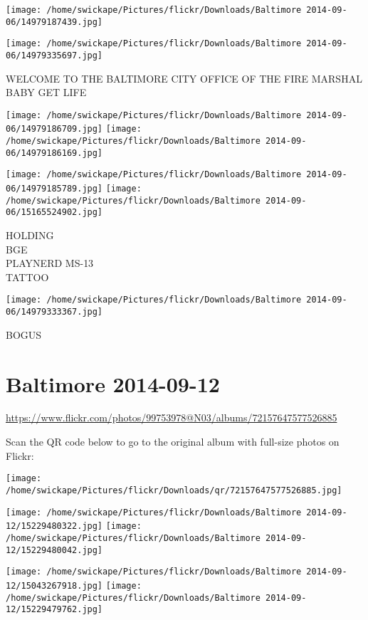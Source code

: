 \documentclass[10pt,letterpaper]{article}
\begin{document}
\texttt{[image: /home/swickape/Pictures/flickr/Downloads/Baltimore 2014-09-06/14979187439.jpg]}

\vspace{0.25in}
\texttt{[image: /home/swickape/Pictures/flickr/Downloads/Baltimore 2014-09-06/14979335697.jpg]}

WELCOME TO THE BALTIMORE CITY OFFICE OF THE FIRE MARSHAL\\
BABY GET LIFE
\pagebreak

\texttt{[image: /home/swickape/Pictures/flickr/Downloads/Baltimore 2014-09-06/14979186709.jpg]}
\texttt{[image: /home/swickape/Pictures/flickr/Downloads/Baltimore 2014-09-06/14979186169.jpg]}

\texttt{[image: /home/swickape/Pictures/flickr/Downloads/Baltimore 2014-09-06/14979185789.jpg]}
\texttt{[image: /home/swickape/Pictures/flickr/Downloads/Baltimore 2014-09-06/15165524902.jpg]}

HOLDING\\
BGE\\
PLAYNERD MS{-}13\\
TATTOO
\pagebreak

\texttt{[image: /home/swickape/Pictures/flickr/Downloads/Baltimore 2014-09-06/14979333367.jpg]}

BOGUS
\pagebreak

\section*{Baltimore 2014-09-12}

\url{https://www.flickr.com/photos/99753978@N03/albums/72157647577526885}

Scan the QR code below to go to the original album with full-size photos on Flickr:

\texttt{[image: /home/swickape/Pictures/flickr/Downloads/qr/72157647577526885.jpg]}
\pagebreak

\texttt{[image: /home/swickape/Pictures/flickr/Downloads/Baltimore 2014-09-12/15229480322.jpg]}
\texttt{[image: /home/swickape/Pictures/flickr/Downloads/Baltimore 2014-09-12/15229480042.jpg]}

\texttt{[image: /home/swickape/Pictures/flickr/Downloads/Baltimore 2014-09-12/15043267918.jpg]}
\texttt{[image: /home/swickape/Pictures/flickr/Downloads/Baltimore 2014-09-12/15229479762.jpg]}
\end{document}
